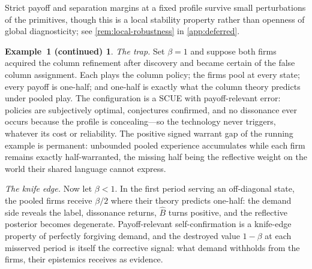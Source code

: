 \documentclass[11pt]{article}
\theoremstyle{definition}
\newtheorem*{excont}{Example~1 (continued)}
\begin{document}
Strict payoff and separation margins at a fixed profile survive small perturbations of the primitives, though this is a local stability property rather than openness of global diagnosticity; see \cref{rem:local-robustness} in \cref{app:deferred}.

\begin{excont}
\emph{The trap.}
Set $\beta=1$ and suppose both firms acquired the column refinement after discovery and became certain of the false column assignment.
Each plays the column policy; the firms pool at every state; every payoff is one-half; and one-half is exactly what the column theory predicts under pooled play.
The configuration is a SCUE with payoff-relevant error: policies are subjectively optimal, conjectures confirmed, and no dissonance ever occurs because the profile is concealing---so the technology never triggers, whatever its cost or reliability.
The positive signed warrant gap of the running example is permanent: unbounded pooled experience accumulates while each firm remains exactly half-warranted, the missing half being the reflective weight on the world their shared language cannot express.

\emph{The knife edge.}
Now let $\beta<1$.
In the first period serving an off-diagonal state, the pooled firms receive $\beta/2$ where their theory predicts one-half: the demand side reveals the label, dissonance returns, $\widehat B$ turns positive, and the reflective posterior becomes degenerate.
Payoff-relevant self-confirmation is a knife-edge property of perfectly forgiving demand, and the destroyed value $1-\beta$ at each misserved period is itself the corrective signal: what demand withholds from the firms, their epistemics receives as evidence.


\end{excont}
\end{document}
